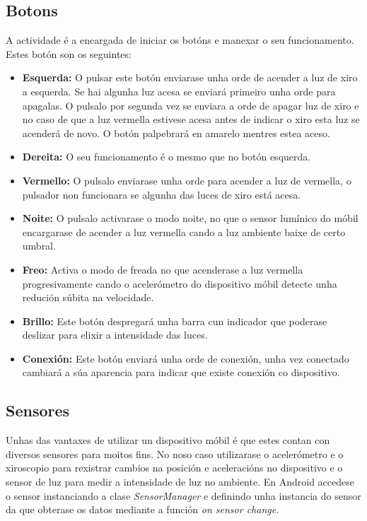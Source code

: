 \subsection{Botons}
A actividade é a encargada de iniciar os botóns e manexar o seu funcionamento. Estes botón son os seguintes:
\begin{itemize}
    \item \textbf{Esquerda:} O pulsar este botón enviarase unha orde de acender a luz de xiro a esquerda. Se hai algunha luz acesa se enviará primeiro unha orde para apagalas. O pulsalo por segunda vez se enviara a orde de apagar luz de xiro e no caso de que a luz vermella estivese acesa antes de indicar o xiro esta luz se acenderá de novo. O botón palpebrará en amarelo mentres estea aceso.
    \item \textbf{Dereita:} O seu funcionamento é o mesmo que no botón esquerda.
    \item \textbf{Vermello:} O pulsalo enviarase unha orde para acender a luz de vermella, o pulsador non funcionara se algunha das luces de xiro está acesa.
    \item \textbf{Noite:} O pulsalo activarase o modo noite, no que o sensor lumínico do móbil encargarase de acender a luz vermella cando a luz ambiente baixe de certo umbral.
    \item \textbf{Freo:} Activa o modo de freada no que acenderase a luz vermella progresivamente cando o acelerómetro do dispositivo móbil detecte unha redución súbita na velocidade.
    \item \textbf{Brillo:} Este botón despregará unha barra cun indicador que poderase deslizar para elixir a intensidade das luces.
    \item \textbf{Conexión:} Este botón enviará unha orde de conexión, unha vez conectado cambiará a súa aparencia para indicar que existe conexión co dispositivo.
\end{itemize}
\subsection{Sensores}
Unhas das vantaxes de utilizar un dispositivo móbil é que estes contan con diversos sensores para moitos fins. No noso caso utilizarase o acelerómetro e o xiroscopio para rexistrar cambios na posición e aceleracións no dispositivo e o sensor de luz para medir a intensidade de luz no ambiente.
En Android accedese o sensor instanciando a clase \emph{SensorManager} e definindo unha instancia do sensor da que obterase os datos mediante a función \emph{on sensor change}.

